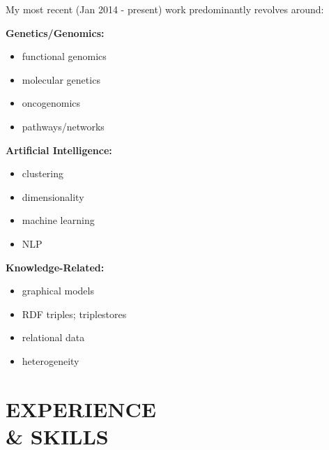 \documentclass[margin]{res} %
\begin{document}
\begin{resume}
My most recent (Jan 2014 - present) work predominantly revolves around:\vspace{0.2 cm}\\
\noindent
	\begin{minipage}[t]{0.35\linewidth}
    \textbf{Genetics/Genomics:}
    \begin{itemize} \itemsep -2pt %
    \item{functional genomics}
    \item{molecular genetics}
    \item{oncogenomics}
    \item{pathways/networks}
    \end{itemize}
    \end{minipage}%
    \begin{minipage}[t]{0.3\linewidth}
    \textbf{Artificial Intelligence:}
    \begin{itemize} \itemsep -2pt %
    \item{clustering}
    \item{dimensionality} 
    \item{machine learning}
    \item{NLP}
    \end{itemize}
    \end{minipage}%
    \begin{minipage}[t]{0.35\linewidth}
    \textbf{Knowledge-Related:}
    \begin{itemize} \itemsep -2pt %
    \item{graphical models}
    \item{RDF triples; triplestores}
    \item{relational data}
    \item{heterogeneity}
    \end{itemize}
\end{minipage}\par %


{\color{blue}\section{EXPERIENCE \\ \& SKILLS} }


\end{resume}
\end{document}
